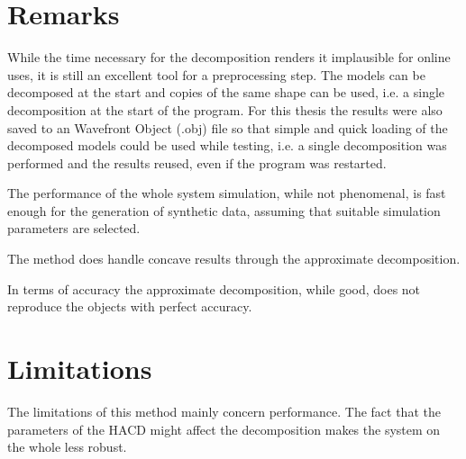 


\section{Remarks}
While the time necessary for the decomposition renders it implausible for online uses,
it is still an excellent tool for a preprocessing step.
The models can be
decomposed at the start and copies of the same shape can be used, i.e. a single decomposition
at the start of the program. For this thesis the results were also saved to an Wavefront Object (.obj) file so that simple and quick
 loading of the decomposed models could be used while testing, i.e. a single decomposition was performed and the results reused, even if the program
 was restarted.

The performance of the whole system simulation, while not phenomenal, is fast enough
for the generation of synthetic data, assuming that suitable simulation parameters
are selected.

The method does handle concave results through the approximate decomposition.

In terms of accuracy the approximate decomposition, while good, does not reproduce the objects
with perfect accuracy.


\section{Limitations}
The limitations of this method mainly concern performance. The fact
that the parameters of the HACD might affect the decomposition makes the system
on the whole less robust.
